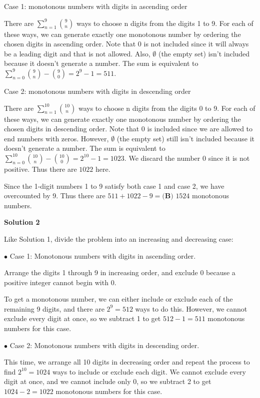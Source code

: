 \begin{enumerate}
Case 1: monotonous numbers with digits in ascending order

 There are $\sum_{n=1}^{9} \binom{9}{n}$ ways to choose n digits from the digits 1 to 9. For each of these ways, we can generate exactly one monotonous number by ordering the chosen digits in ascending order. Note that 0 is not included since it will always be a leading digit and that is not allowed. Also, $\emptyset$ (the empty set) isn't included because it doesn't generate a number. The sum is equivalent to $\sum_{n=0}^{9} \binom{9}{n} -\binom{9}{0} = 2^9 - 1 = 511.$

 Case 2: monotonous numbers with digits in descending order

 There are $\sum_{n=1}^{10} \binom{10}{n}$ ways to choose n digits from the digits 0 to 9. For each of these ways, we can generate exactly one monotonous number by ordering the chosen digits in descending order. Note that 0 is included since we are allowed to end numbers with zeros. However, $\emptyset$ (the empty set) still isn't included because it doesn't generate a number. The sum is equivalent to $\sum_{n=0}^{10} \binom{10}{n} -\binom{10}{0} = 2^{10} - 1 = 1023.$ We discard the number 0 since it is not positive. Thus there are $1022$ here. 

 Since the 1-digit numbers 1 to 9 satisfy both case 1 and case 2, we have overcounted by 9. Thus there are $511+1022-9=\boxed{\textbf{(B) }  1524}$ monotonous numbers.

 



\textbf{Solution 2}

Like Solution 1, divide the problem into an increasing and decreasing case:

 $\bullet$ Case 1: Monotonous numbers with digits in ascending order.

 Arrange the digits 1 through 9 in increasing order, and exclude 0 because a positive integer cannot begin with 0.

 To get a monotonous number, we can either include or exclude each of the remaining 9 digits, and there are $2^9 = 512$ ways to do this. However, we cannot exclude every digit at once, so we subtract 1 to get $512-1=511$ monotonous numbers for this case.

 $\bullet$ Case 2: Monotonous numbers with digits in descending order.

 This time, we arrange all 10 digits in decreasing order and repeat the process to find $2^{10} = 1024$ ways to include or exclude each digit. We cannot exclude every digit at once, and we cannot include only 0, so we subtract 2 to get $1024-2=1022$ monotonous numbers for this case.


\end{enumerate}

